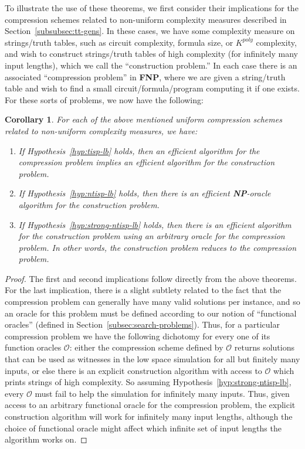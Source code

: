\documentclass[11pt]{article}
\newtheorem{corollary}{Corollary}
\def\cl{\bf}
\begin{document}
To illustrate the use of these theorems, we first consider their implications for the compression schemes related to non-uniform complexity measures described in Section~\ref{subsubsec:tt-gens}. In these cases, we have some complexity measure on strings/truth tables, such as circuit complexity, formula size, or $K^{poly}$ complexity, and wish to construct strings/truth tables of high complexity (for infinitely many input lengths), which we call the ``construction problem.'' In each case there is an associated ``compression problem'' in {\cl FNP}, where we are given a string/truth table and wish to find a small circuit/formula/program computing it if one exists. For these sorts of problems, we now have the following:
\begin{corollary}\label{cor:main-impls}
For each of the above mentioned uniform compression schemes related to non-uniform complexity measures, we have:
\begin{enumerate}
    \item If Hypothesis~\ref{hyp:tisp-lb} holds, then an efficient algorithm for the compression problem implies an efficient algorithm for the construction problem.
    \item If Hypothesis~\ref{hyp:ntisp-lb} holds, then there is an efficient {\cl NP}-oracle algorithm for the construction problem.
    \item If Hypothesis~\ref{hyp:strong-ntisp-lb} holds, then there is an efficient algorithm for the construction problem using an arbitrary oracle for the compression problem. In other words, the construction problem reduces to the compression problem.
\end{enumerate}
\end{corollary}
\begin{proof}
The first and second implications follow directly from the above theorems. For the last implication, there is a slight subtlety  related to the fact that the compression problem can generally have many valid solutions per instance, and so an oracle for this problem must be defined according to our notion of ``functional oracles'' (defined in Section~\ref{subsec:search-problems}). Thus, for a particular compression problem we have the following dichotomy for every one of its function oracles $\mathcal{O}$: either the compression scheme defined by $\mathcal{O}$ returns solutions that can be used as witnesses in the low space simulation for all but finitely many inputs, or else there is an explicit construction algorithm with access to $\mathcal{O}$ which prints strings of high complexity. So assuming Hypothesis~\ref{hyp:strong-ntisp-lb}, every $\mathcal{O}$ must fail to help the simulation for infinitely many inputs. Thus, given access to an arbitrary functional oracle for the compression problem, the explicit construction algorithm will work for infinitely many input lengths, although the choice of functional oracle might affect which infinite set of input lengths the algorithm works on.
\end{proof}
\end{document}
